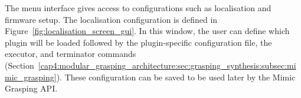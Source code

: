 \begin{figure}[h!]
\end{figure}

The menu interface gives access to configurations such as localisation and firmware setup. The localisation configuration is defined in Figure~\ref{fig:localisation_screen_gui}. In this window, the user can define which plugin will be loaded followed by the plugin-specific configuration file, the executor, and terminator commands (Section~\ref{cap4:modular_grasping_architecture:sec:grasping_synthesis:subsec:mimic_grasping}). These configuration can be saved to be used later by the Mimic Grasping API.

